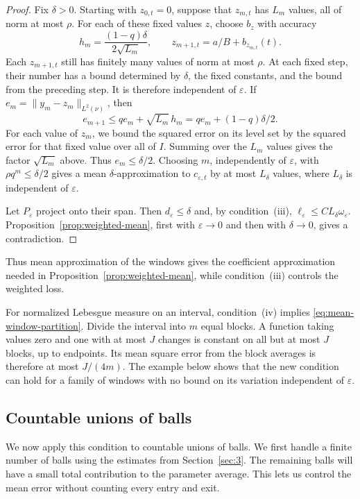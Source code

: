 \documentclass[12pt,reqno,tbtags]{amsart}
\newcommand\norm[1]{\|#1\|}
\newcommand\1{\mathbbm{1}}
\newcommand{\eps}{\varepsilon}
\begin{document}
\begin{proof}
Fix $\delta>0$. Starting with $z_{0,t}=0$, suppose that $z_{m,t}$ has
$L_m$ values, all of norm at most $\rho$. For each of these fixed values $z$,
choose $b_z$ with accuracy
\begin{equation*}
    h_m=\frac{(1-q)\delta}{2\sqrt{L_m}},
    \qquad z_{m+1,t}=a/B+b_{z_{m,t}}(t).
\end{equation*}
Each $z_{m+1,t}$ still has finitely many values of norm at most $\rho$.
At each fixed step, their number has a bound determined by $\delta$, the
fixed constants, and the bound from the preceding step. It is therefore
independent of $\eps$.
If $e_m=\norm{y_m-z_m}_{L^2(\nu)}$, then
\begin{equation*}
    e_{m+1}\le qe_m+\sqrt{L_m}\,h_m
    =qe_m+(1-q)\delta/2.
\end{equation*}
For each value of $z_m$, we bound the squared error on its level set by
the squared error for that fixed value over all of $I$.
Summing over the $L_m$ values gives the factor $\sqrt{L_m}$ above.
Thus $e_m\le\delta/2$.
Choosing $m$, independently of $\eps$, with $\rho q^m\le\delta/2$ gives a mean $\delta$-approximation
to $c_{\eps,t}$ by at most $L_\delta$ values, where $L_\delta$ is independent
of $\eps$.

Let $P_\eps$ project onto their span. Then $d_\eps\le\delta$ and,
by condition~(iii), $\ell_\eps\le CL_\delta\omega_\eps$.
Proposition~\ref{prop:weighted-mean}, first with $\eps\to0$ and then with
$\delta\to0$, gives a contradiction.
\end{proof}

Thus mean approximation of the windows gives the coefficient approximation
needed in Proposition~\ref{prop:weighted-mean}, while condition~(iii) controls
the weighted loss.

For normalized Lebesgue measure on an interval, condition~(iv) implies
\eqref{eq:mean-window-partition}. Divide the interval into $m$ equal blocks.
A function taking values zero and one with at most $J$ changes is constant
on all but at most $J$ blocks, up to endpoints. Its mean square error
from the block averages is therefore at most $J/(4m)$.
The example below shows that the new condition can hold for a family of
windows with no bound on its variation independent of $\eps$.

\subsection{Countable unions of balls}

We now apply this condition to countable unions of balls.
We first handle a finite number of balls using the estimates from
Section~\ref{sec:3}. The remaining balls will have a small total contribution
to the parameter average. This lets us control the mean error without
counting every entry and exit.
\end{document}

